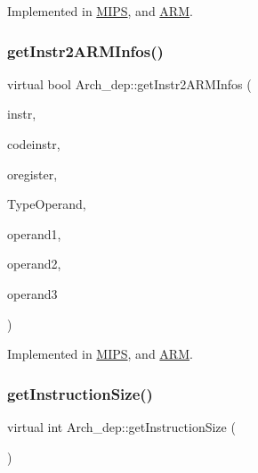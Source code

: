 Implemented in \hyperlink{classMIPS_add97e24f0dff226385044368b82cb6f1}{M\+I\+PS}, and \hyperlink{classARM_a4434e1ab868a4d3a26940aaec3366dd0}{A\+RM}.

\mbox{\label{classArch__dep_ae9c1e0474e6414808dc6c8658ef0ddba}} 
\subsubsection{\texorpdfstring{get\+Instr2\+A\+R\+M\+Infos()}{getInstr2ARMInfos()}}
{\footnotesize\ttfamily virtual bool Arch\+\_\+dep\+::get\+Instr2\+A\+R\+M\+Infos (\begin{DoxyParamCaption}\item[{string \&}]{instr,  }\item[{string \&}]{codeinstr,  }\item[{string \&}]{oregister,  }\item[{\hyperlink{arch_8h_a63b66e201ffc27bbc8f89c8808382044}{offset\+Type} $\ast$}]{Type\+Operand,  }\item[{string \&}]{operand1,  }\item[{string \&}]{operand2,  }\item[{string \&}]{operand3 }\end{DoxyParamCaption})\hspace{0.3cm}{\ttfamily [pure virtual]}}



Implemented in \hyperlink{classMIPS_aefb9849f91cfe9bcb6baa71bcf0b4aa8}{M\+I\+PS}, and \hyperlink{classARM_a4a8d73d140cf70b7fb73d0359d9c52d0}{A\+RM}.

\mbox{\label{classArch__dep_a845395b8503a23b2c192e8b4a05ccba9}} 
\subsubsection{\texorpdfstring{get\+Instruction\+Size()}{getInstructionSize()}}
{\footnotesize\ttfamily virtual int Arch\+\_\+dep\+::get\+Instruction\+Size (\begin{DoxyParamCaption}{ }\end{DoxyParamCaption})\hspace{0.3cm}{\ttfamily [pure virtual]}}

